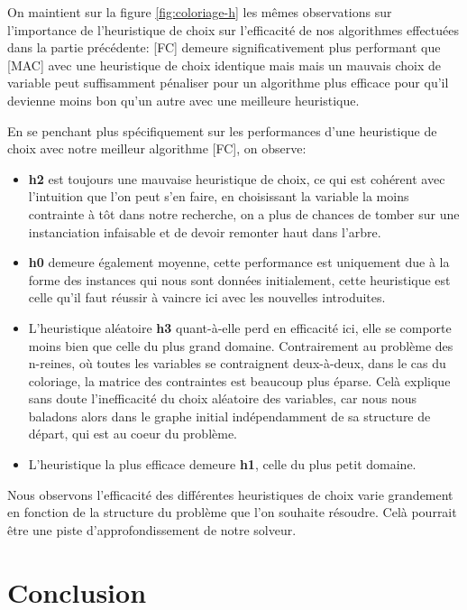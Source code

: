 \documentclass[14pt]{article}
\begin{document}
On maintient sur la figure \ref{fig:coloriage-h} les mêmes observations sur l'importance de l'heuristique de choix sur l'efficacité de nos algorithmes effectuées dans la partie précédente: [FC] demeure significativement plus performant que [MAC] avec une heuristique de choix identique mais mais un mauvais choix de variable peut suffisamment pénaliser pour un algorithme plus efficace pour qu'il devienne moins bon qu'un autre avec une meilleure heuristique.

En se penchant plus spécifiquement sur les performances d'une heuristique de choix avec notre meilleur algorithme [FC], on observe:
\begin{itemize}
	\item \textbf{h2} est toujours une mauvaise heuristique de choix, ce qui est cohérent avec l'intuition que l'on peut s'en faire, en choisissant la variable la moins contrainte à tôt dans notre recherche, on a plus de chances de tomber sur une instanciation infaisable et de devoir remonter haut dans l'arbre.
	\item \textbf{h0} demeure également moyenne, cette performance est uniquement due à la forme des instances qui nous sont données initialement, cette heuristique est celle qu'il faut réussir à vaincre ici avec les nouvelles introduites.
	\item L'heuristique aléatoire \textbf{h3} quant-à-elle perd en efficacité ici, elle se comporte moins bien que celle du plus grand domaine. Contrairement au problème des n-reines, où toutes les variables se contraignent deux-à-deux, dans le cas du coloriage, la matrice des contraintes est beaucoup plus éparse. Celà explique sans doute l'inefficacité du choix aléatoire des variables, car nous nous baladons alors dans le graphe initial indépendamment de sa structure de départ, qui est au coeur du problème.
	\item L'heuristique la plus efficace demeure \textbf{h1}, celle du plus petit domaine.
\end{itemize}

Nous observons l'efficacité des différentes heuristiques de choix varie grandement en fonction de la structure du problème que l'on souhaite résoudre. Celà pourrait être une piste d'approfondissement de notre solveur.

\clearpage

\section{Conclusion}
\end{document}
